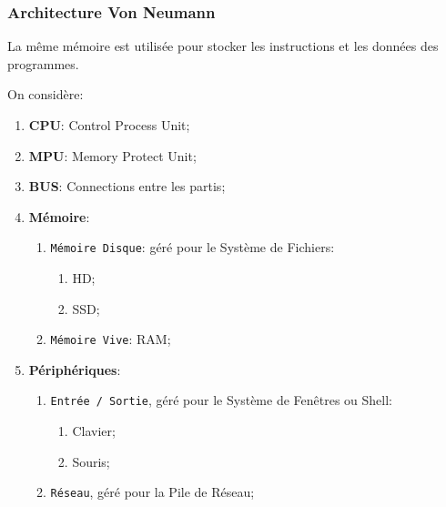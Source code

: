 \documentclass{article}
\begin{document}
\subsubsection{Architecture Von Neumann}
\begin{definition}\label{def:architectureVonNeumann}
    La même mémoire est utilisée pour stocker les instructions et les données des programmes.

    \begin{figure}[H]
        \centering{}
    \end{figure}
    On considère:
    \begin{enumerate}
        \item \textbf{CPU}: Control Process Unit;
        \item \textbf{MPU}: Memory Protect Unit;
        \item \textbf{BUS}: Connections entre les partis;
        \item \textbf{Mémoire}:
        \begin{enumerate}[noitemsep]
            \item \texttt{Mémoire Disque}: géré pour le Système de Fichiers:
            \begin{enumerate}[noitemsep]
                \item HD;
                \item SSD;
            \end{enumerate}
            \item \texttt{Mémoire Vive}: RAM;
        \end{enumerate}
        \item \textbf{Périphériques}:
        \begin{enumerate}[noitemsep]
            \item \texttt{Entrée / Sortie}, géré pour le Système de Fenêtres ou Shell:
            \begin{enumerate}[noitemsep]
                \item Clavier;
                \item Souris; 
            \end{enumerate}
            \item \texttt{Réseau}, géré pour la Pile de Réseau;
        \end{enumerate}
    \end{enumerate}


\end{definition}
\end{document}
